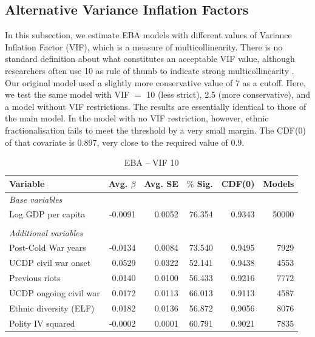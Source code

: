 \documentclass[a4paper,12pt]{article}
\begin{document}
\subsection{Alternative Variance Inflation Factors}

In this subsection, we estimate EBA models with different values of Variance Inflation Factor (VIF), which is a measure of multicollinearity. There is no standard definition about what constitutes an acceptable VIF value, although researchers often use 10 as rule of thumb to indicate strong multicollinearity \citep[674]{o2007caution}. Our original model used a slightly more conservative value of 7 as a cutoff. Here, we test the same model with VIF $=$ 10 (less strict), 2.5 (more conservative), and a model without VIF restrictions. The results are essentially identical to those of the main model. In the model with no VIF restriction, however, ethnic fractionalisation fails to meet the threshold by a very small margin. The CDF(0) of that covariate is 0.897, very close to the required value of 0.9. 

\vspace{1cm}

\begin{table}[H]
\centering
\begin{tabular}{lrrrrr}
\hline
\textbf{Variable} & \textbf{Avg. $\beta$} & \textbf{Avg. SE} & \textbf{$\%$ Sig.} & \textbf{CDF(0)} & \textbf{Models} \\ \hline
\textit{Base variables} &  &  &  &  &  \\
Log GDP per capita & -0.0091 & 0.0052 & 76.354 & 0.9343 & 50000 \\
 &  &  &  &  &  \\
\textit{Additional variables} &  &  &  &  &  \\
Post-Cold War years & -0.0134 & 0.0084 & 73.540 & 0.9495 & 7929 \\
UCDP civil war onset & 0.0529 & 0.0322 & 52.141 & 0.9438 & 4553 \\
Previous riots & 0.0140 & 0.0100 & 56.433 & 0.9216 & 7772 \\
UCDP ongoing civil war & 0.0172 & 0.0113 & 66.013 & 0.9113 & 4587 \\
Ethnic diversity (ELF) & 0.0182 & 0.0136 & 56.872 & 0.9056 & 8076 \\
Polity IV squared & -0.0002 & 0.0001 & 60.791 & 0.9021 & 7835 \\ \hline
\end{tabular}
\caption{EBA -- VIF 10}
\label{tab:mk-high-vif}
\end{table}
\end{document}

